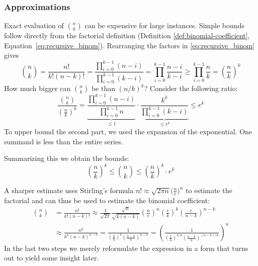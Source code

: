 \subsubsection{Approximations}
\label{subsubsec:binom-approx}
Exact evaluation of \(\binom{n}{k}\) can be expensive for large instances.  
Simple bounds follow directly from the factorial definition (Definition \ref{def:binomial-coefficient}, Equation~\eqref{eq:recursive_binom}).
Rearranging the factors in \eqref{eq:recursive_binom} gives
\[
\binom{n}{k} = \frac{n!}{k!(n-k)!}
= \frac{\prod_{i=0}^{k-1}(n-i)}{\prod_{i=0}^{k-1}(k-i)}
= \prod_{i=0}^{k-1}\frac{n-i}{k-i}
\geq \prod_{i=0}^{k-1}\frac{n}{k} 
= \left(\frac{n}{k}\right)^{k}
\]
How much bigger can $\binom{n}{k}$ be than $(n / k)^k$?
Consider the following ratio:
\[
\frac{\binom{n}{k}}{\left(\frac{n}{k}\right)^k}=\underbrace{\frac{\prod_{i=0}^{k-1}(n-i)}{\prod_{i=0}^{k-1}n}}_{\leq 1} \cdot \underbrace{\frac{k^k}{\prod_{i=0}^{k-1}(k-i)}}_{\leq e^k} \leq e^k
\]
To upper bound the second part, we used the expansion of the exponential. 
One summand is less than the entire series.

Summarizing this we obtain the bounds:
\begin{equation}\label{eq:binom-basic-bounds}
\left(\frac{n}{k}\right)^k \leq\binom{ n}{k} \leq\left(\frac{n}{k}\right)^k \cdot e^k
\end{equation}

A sharper estimate uses Stirling's formula 
\(
  n! \approx \sqrt{2\pi n}\bigl(\tfrac{n}{e}\bigr)^{n}
\) 
to estimate the factorial and can thus be used to estimate the binomial coefficient:
\[
\begin{aligned}
\binom{n}{k} & =\frac{n!}{k!(n-k)!} \approx \frac{1}{\sqrt{2 \pi}} \frac{\sqrt{n}}{\sqrt{k(n-k)}}\left(\frac{n}{e}\right)^n\left(\frac{e}{k}\right)^k\left(\frac{e}{n-k}\right)^{n-k} \\
& \approx \frac{n^n}{k^k(n-k)^{n-k}}=\frac{1}{\left(\frac{k}{n}\right)^k\left(\frac{n-k}{n}\right)^{n-k}} =\left(\frac{1}{\left(\frac{k}{n}\right)^{k / n}\left(\frac{n-k}{n}\right)^{(n-k) / n}}\right)^n
\end{aligned}
\]
In the last two steps we merely reformulate the expression in a form that turns out to yield some insight later.

